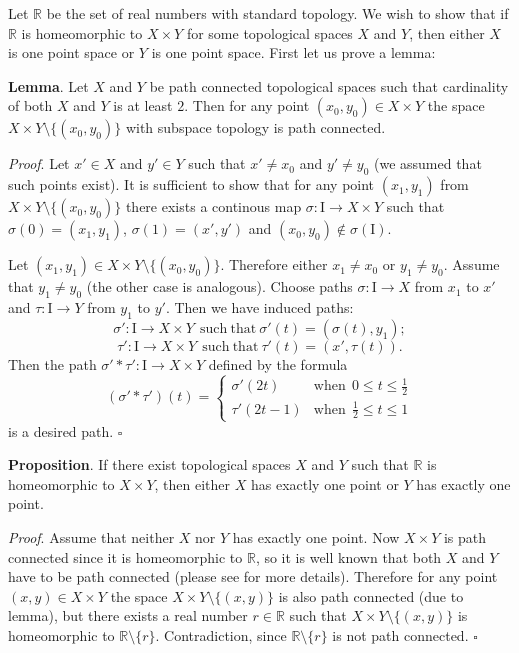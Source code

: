\documentclass[12pt]{article}
\begin{document}
Let $\mathbb{R}$ be the set of real numbers with standard topology. We wish to show that if $\mathbb{R}$ is homeomorphic to $X\times Y$ for some topological spaces $X$ and $Y$, then either $X$ is one point space or $Y$ is one point space. First let us prove a lemma:

\textbf{Lemma}. Let $X$ and $Y$ be path connected topological spaces such that cardinality of both $X$ and $Y$ is at least $2$. Then for any point $(x_0,y_0)\in X\times Y$ the space $X\times Y \setminus \{(x_0,y_0)\}$ with subspace topology is path connected.

\textit{Proof}. Let $x'\in X$ and $y'\in Y$ such that $x'\neq x_0$ and $y'\neq y_0$ (we assumed that such points exist). It is sufficient to show that for any point $(x_1,y_1)$ from $X\times Y \setminus \{(x_0,y_0)\}$ there exists a continous map $\sigma:\mathrm{I}\to X\times Y$ such that $\sigma(0)=(x_1,y_1)$, $\sigma(1)=(x',y')$ and $(x_0,y_0)\not\in\sigma(\mathrm{I})$.

Let $(x_1,y_1)\in X\times Y \setminus \{(x_0,y_0)\}$. Therefore either $x_1\neq x_0$ or $y_1\neq y_0$. Assume that $y_1\neq y_0$ (the other case is analogous). Choose paths $\sigma:\mathrm{I}\to X$ from $x_1$ to $x'$ and $\tau:\mathrm{I}\to Y$ from $y_1$ to $y'$. Then we have induced paths:
$$\sigma':\mathrm{I}\to X\times Y\ \ \mathrm{such}\ \mathrm{that}\ \sigma'(t)=(\sigma(t),y_1);$$
$$\tau':\mathrm{I}\to X\times Y\ \ \mathrm{such}\ \mathrm{that}\ \tau'(t)=(x',\tau(t)).$$
Then the path $\sigma' * \tau':\mathrm{I}\to X\times Y$ defined by the formula
\[
(\sigma' * \tau')(t) = \begin{cases} \sigma'(2t)  &\mathrm{when}\ \ 0\leq t\leq\frac{1}{2}\\
\tau'(2t-1) &\mathrm{when}\ \ \frac{1}{2}\leq t\leq 1
\end{cases}
\]
is a desired path. $\square$

\textbf{Proposition}. If there exist topological spaces $X$ and $Y$ such that $\mathbb{R}$ is homeomorphic to $X\times Y$, then either $X$ has exactly one point or $Y$ has exactly one point.

\textit{Proof}. Assume that neither $X$ nor $Y$ has exactly one point. Now $X\times Y$ is path connected since it is homeomorphic to $\mathbb{R}$, so it is well known that both $X$ and $Y$ have to be path connected (please see  for more details). Therefore for any point $(x,y)\in X\times Y$ the space $X\times Y\setminus \{(x,y)\}$ is also path connected (due to lemma), but there exists a real number $r\in\mathbb{R}$ such that $X\times Y\setminus \{(x,y)\}$ is homeomorphic to $\mathbb{R}\setminus\{r\}$. Contradiction, since $\mathbb{R}\setminus\{r\}$ is not path connected. $\square$
\end{document}
